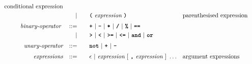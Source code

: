 \begin{alignat*}{9}
                                                           && \textrm{conditional expression}\\
&&                       && |   &\quad &&  \textbf{\texttt{(}}\  \textit{expression} \ 
                                            \textbf{\texttt{)}} && \textrm{parenthesised expression}\\[1mm]
&& \textit{binary-operator}    \ 
                        && ::= &\quad && \textbf{\texttt{+}}\ |\ \textbf{\texttt{-}}\ |\ \textbf{\texttt{*}}\ |\ \textbf{\texttt{/}}\ |\ \textbf{\texttt{\%}}\ |\ 
                                   \textbf{\texttt{==}}\ \\ %
&&                       && |  &\quad &&  \texttt{\textbf{>}}\ |\ \texttt{\textbf{<}}\ |\ \texttt{\textbf{>=}}\ |\ \texttt{\textbf{<=}}\
                                          |\ \textbf{\texttt{and}}\ |\ \texttt{\textbf{or}}\  \\[1mm]
&& \textit{unary-operator}    
                        && ::= &\quad && \textbf{\texttt{not}}\ |\ \textbf{\texttt{+}}\ |\ \textbf{\texttt{-}} \\[1mm]
&& \textit{expressions}  && ::= &\quad && \epsilon\ | \ \textit{expression}\ [
                                                               \ \textbf{\texttt{,}} \
                                                                 \textit{expression} \ 
                                                                      ]\ \ldots
                                                            && \textrm{argument expressions}
\end{alignat*}

\newpage